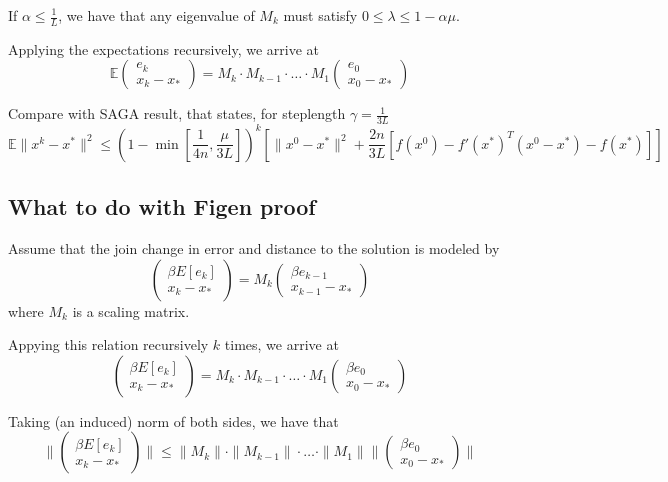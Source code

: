 \documentclass[11pt]{article}
\begin{document}
If $\alpha \leq \frac{1}{L}$, we have that any eigenvalue of $M_k$ must satisfy $0 \leq \lambda \leq 1 - \alpha \mu$.

Applying the expectations recursively, we arrive at 
\[
\mathbb{E} \begin{pmatrix} \displaystyle e_k \\ x_k-x_\ast \end{pmatrix} 
= M_k \cdot M_{k-1} \cdot \ldots \cdot M_1
 \begin{pmatrix} \displaystyle  e_{0} \\ x_{0}-x_\ast \end{pmatrix}
	 \]

Compare with SAGA result, that states, for steplength $\gamma  = \frac{1}{3L}$
\begin{equation}
	\mathbb{E} \|x^k - x^*\|^2 \leq {\left( 1 - \min \left[ \frac{1}{4n}, \frac{\mu}{3L} \right]  \right)}^k \left[  \|x^0 - x^* \|^2 + \frac{2n}{3L} \left[ f(x^0) - f'(x^*)^T (x^0-x^*) - f(x^*)\right] \right]
\end{equation}

\subsection{What to do with Figen proof}


Assume that the join change in error and distance to the solution is modeled by  
\[ 
\begin{pmatrix}
	\beta E[e_k] \\
	x_k-x_\ast 
\end{pmatrix}
= M_k 
\begin{pmatrix}
	\displaystyle \beta e_{k-1} \\
	x_{k-1}-x_\ast 
\end{pmatrix}
\]
where $M_k$ is a scaling matrix.

Appying this relation recursively $k$ times, we arrive at
\[ 
\begin{pmatrix}
	\beta E[e_k] \\
	x_k-x_\ast 
\end{pmatrix}
= 
M_k \cdot M_{k-1} \cdot \ldots \cdot M_1
\begin{pmatrix}
	\displaystyle \beta e_0 \\
	x_0-x_\ast 
\end{pmatrix}
\]

Taking (an induced) norm of both sides, we have that
\[ 
\| 
\begin{pmatrix}
	\beta E[e_k] \\
	x_k-x_\ast 
\end{pmatrix}
\| 
\leq 
\| M_k \|  \cdot \|  M_{k-1} \| \cdot \ldots \cdot \|  M_1 \|
\|
\begin{pmatrix}
	\displaystyle \beta e_0 \\
	x_0-x_\ast 
\end{pmatrix}
\| 
\]
\end{document}
